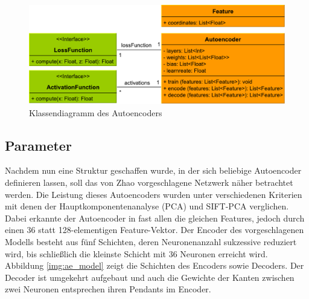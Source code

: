 \begin{figure}
	\centering
	\includegraphics[scale=0.6]{images/ae_class.pdf}
	\caption{Klassendiagramm des Autoencoders}
	\label{img:ae_class}
\end{figure}

\subsection{Parameter}

Nachdem nun eine Struktur geschaffen wurde, in der sich beliebige Autoencoder definieren lassen, soll das von Zhao vorgeschlagene Netzwerk näher betrachtet werden. Die Leistung dieses Autoencoders wurden unter verschiedenen Kriterien mit denen der Hauptkomponentenanalyse (PCA) und SIFT-PCA verglichen. Dabei erkannte der Autoencoder in fast allen die gleichen Features, jedoch durch einen 36 statt 128-elementigen Feature-Vektor. Der Encoder des vorgeschlagenen Modells besteht aus fünf Schichten, deren Neuronenanzahl sukzessive reduziert wird, bis schließlich die kleinste Schicht mit 36 Neuronen erreicht wird. Abbildung \ref{img:ae_model} zeigt die Schichten des Encoders sowie Decoders. Der Decoder ist umgekehrt aufgebaut und auch die Gewichte der Kanten zwischen zwei Neuronen entsprechen ihren Pendants im Encoder.

